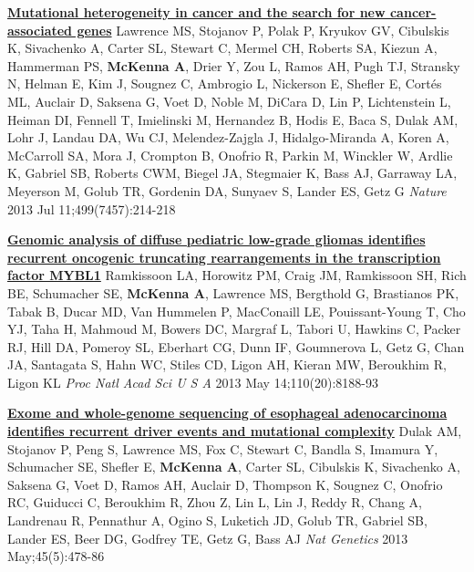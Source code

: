 \documentclass[9pt]{article}
\begin{document}
\noindent\href{https://www.ncbi.nlm.nih.gov/pubmed/23770567}{\bf  Mutational heterogeneity in cancer and the search for new cancer-associated genes}\vspace{-0.03in}
\newline\noindent Lawrence MS, Stojanov P, Polak P, Kryukov GV, Cibulskis K, Sivachenko A, Carter SL, Stewart C, Mermel CH, Roberts SA, Kiezun A, Hammerman PS, \textbf{McKenna A}, Drier Y, Zou L, Ramos AH, Pugh TJ, Stransky N, Helman E, Kim J, Sougnez C, Ambrogio L, Nickerson E, Shefler E, Cortés ML, Auclair D, Saksena G, Voet D, Noble M, DiCara D, Lin P, Lichtenstein L, Heiman DI, Fennell T, Imielinski M, Hernandez B, Hodis E, Baca S, Dulak AM, Lohr J, Landau DA, Wu CJ, Melendez-Zajgla J, Hidalgo-Miranda A, Koren A, McCarroll SA, Mora J, Crompton B, Onofrio R, Parkin M, Winckler W, Ardlie K, Gabriel SB, Roberts CWM, Biegel JA, Stegmaier K,  Bass AJ, Garraway LA, Meyerson M, Golub TR, Gordenin DA, Sunyaev S, Lander ES, Getz G
\newline\noindent\emph{ Nature} 2013 Jul 11;499(7457):214-218
\bigskip

\noindent\href{https://www.ncbi.nlm.nih.gov/pubmed/None}{\bf  Genomic analysis of diffuse pediatric low-grade gliomas identifies recurrent oncogenic truncating rearrangements in the transcription factor MYBL1}\vspace{-0.03in}
\newline\noindent Ramkissoon LA, Horowitz PM, Craig JM, Ramkissoon SH, Rich BE, Schumacher SE,  \textbf{McKenna A}, Lawrence MS, Bergthold G, Brastianos PK, Tabak B, Ducar MD, Van Hummelen P, MacConaill LE, Pouissant-Young T, Cho YJ, Taha H, Mahmoud M, Bowers DC, Margraf L, Tabori U, Hawkins C, Packer RJ, Hill DA, Pomeroy SL, Eberhart CG,  Dunn IF, Goumnerova L, Getz G, Chan JA, Santagata S, Hahn WC, Stiles CD, Ligon AH, Kieran MW, Beroukhim R, Ligon KL
\newline\noindent\emph{ Proc Natl Acad Sci U S A} 2013 May 14;110(20):8188-93
\bigskip

\noindent\href{https://www.ncbi.nlm.nih.gov/pubmed/23525077}{\bf  Exome and whole-genome sequencing of esophageal adenocarcinoma identifies recurrent driver events and mutational complexity}\vspace{-0.03in}
\newline\noindent Dulak AM, Stojanov P, Peng S, Lawrence MS, Fox C, Stewart C, Bandla S, Imamura Y, Schumacher SE, Shefler E, \textbf{McKenna A}, Carter SL, Cibulskis K, Sivachenko A, Saksena G, Voet D, Ramos AH, Auclair D, Thompson K, Sougnez C, Onofrio RC, Guiducci C, Beroukhim R, Zhou Z, Lin L, Lin J, Reddy R, Chang A, Landrenau R, Pennathur A, Ogino S, Luketich JD, Golub TR, Gabriel SB, Lander ES,  Beer DG, Godfrey TE, Getz G, Bass AJ
\newline\noindent\emph{ Nat Genetics} 2013 May;45(5):478-86
\bigskip
\end{document}
